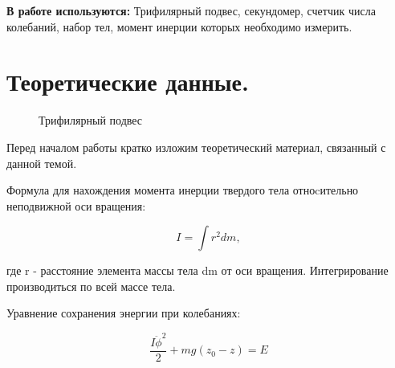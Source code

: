 \documentclass[a4paper,12pt]{article} %
\begin{document}
\medskip

\textbf{В работе используются:} Трифилярный подвес, секундомер, счетчик числа колебаний, набор тел, момент инерции которых необходимо измерить.

\medskip



\section{Теоретические данные.}

\begin{figure}[h]
\caption{Трифилярный подвес}
\label{fig:image}
\end{figure}

	Перед началом работы кратко изложим теоретический материал, связанный с данной темой.

	
	Формула для нахождения момента инерции твердого тела отноcительно неподвижной оси вращения:

	\begin{equation}
			I = \int r^2 dm, 
			 \label{equ:iner}	
	\end{equation}

	где r - расстояние элемента массы тела dm от оси вращения. Интегрирование производиться по всей массе тела.

		
	Уравнение сохранения энергии при колебаниях:

			\[ \frac{I\ddot{\phi}^2}{2} + mg(z_{0} - z) = E \]
\end{document}
